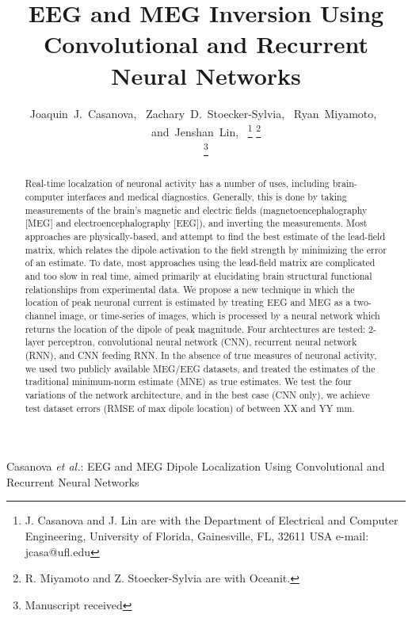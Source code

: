 \documentclass[journal]{IEEEtran}
\begin{document}

\title{EEG and MEG Inversion Using Convolutional and Recurrent Neural Networks}
%
%
%

\author{Joaquin~J.~Casanova,~
        Zachary~D.~Stoecker-Sylvia,~
        Ryan~Miyamoto,~
        and~Jenshan~Lin,~%
\thanks{J. Casanova and J. Lin are with the Department
of Electrical and Computer Engineering, University of Florida, Gainesville,
FL, 32611 USA e-mail: jcasa@ufl.edu}%
\thanks{R. Miyamoto and Z. Stoecker-Sylvia are with Oceanit.}%

\thanks{Manuscript received }}

%
{Casanova \MakeLowercase{\textit{et al.}}: EEG and MEG Dipole Localization Using Convolutional and Recurrent Neural Networks}
\maketitle

\begin{abstract}

  Real-time localzation of neuronal activity has a number of uses, including brain-computer interfaces and medical diagnostics. Generally, this is done by taking measurements of the brain's magnetic and electric fields (magnetoencephalography [MEG] and electroencephalography [EEG]), and inverting the measurements. Most approaches are physically-based, and attempt to find the best estimate of the lead-field matrix, which relates the dipole activation to the field strength by minimizing the error of an estimate. To date, most approaches using the lead-field matrix are complicated and too slow in real time, aimed primarily at elucidating brain structural functional relationships from experimental data. We propose a new technique in which the location of peak neuronal current is estimated by treating EEG and MEG as a two-channel image, or time-series of images, which is processed by a neural network which returns the location of the dipole of peak magnitude. Four archtectures are tested: 2-layer perceptron, convolutional neural network (CNN), recurrent neural network (RNN), and CNN feeding RNN. In the absence of true measures of neuronal activity, we used two publicly available MEG/EEG datasets, and treated the estimates of the traditional minimum-norm estimate (MNE) as true estimates. We test the four variations of the network architecture, and in the best case (CNN only), we achieve test dataset errors (RMSE of max dipole location) of between XX and YY mm.
  
\end{abstract}
\end{document}
